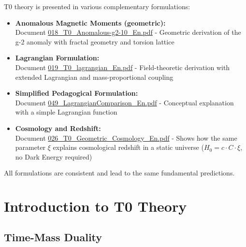 	
	\begin{tcolorbox}[colback=blue!10!white, colframe=blue!75!black, title=References to Complementary T0 Formulations]
		T0 theory is presented in various complementary formulations:
		
		\begin{itemize}
			\item \textbf{Anomalous Magnetic Moments (geometric):} \\
			Document \href{https://github.com/jpascher/T0-Time-Mass-Duality/blob/main/2/pdf/018_T0_Anomalous-g2-10_En.pdf}{018\_T0\_Anomalous-g2-10\_En.pdf} - 
			Geometric derivation of the g-2 anomaly with fractal geometry and torsion lattice
			
			\item \textbf{Lagrangian Formulation:} \\
			Document \href{https://github.com/jpascher/T0-Time-Mass-Duality/blob/main/2/pdf/019_T0_lagrangian_En.pdf}{019\_T0\_lagrangian\_En.pdf} - 
			Field-theoretic derivation with extended Lagrangian and mass-proportional coupling
			
			\item \textbf{Simplified Pedagogical Formulation:} \\
			Document \href{https://github.com/jpascher/T0-Time-Mass-Duality/blob/main/2/pdf/049_LagrangianComparison_En.pdf}{049\_LagrangianComparison\_En.pdf} - 
			Conceptual explanation with a simple Lagrangian function
			
			\item \textbf{Cosmology and Redshift:} \\
			Document \href{https://github.com/jpascher/T0-Time-Mass-Duality/blob/main/2/pdf/026_T0_Geometric_Cosmology_En.pdf}{026\_T0\_Geometric\_Cosmology\_En.pdf} - 
			Shows how the same parameter $\xi$ explains cosmological redshift in a static universe ($H_0 = c \cdot C \cdot \xi$, no Dark Energy required)
		\end{itemize}
		
		All formulations are consistent and lead to the same fundamental predictions.
	\end{tcolorbox}
	
	
	\section{Introduction to T0 Theory}
	
	\subsection{Time-Mass Duality}
	
